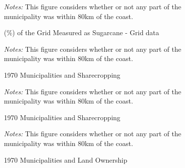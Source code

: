 \documentclass{article}
\begin{document}
\begin{figure}
  \caption{(\%) of the Grid Measured as Sugarcane - Grid data}
  \begin{center}
  \textit{Notes:} This figure considers whether or not any part of the municipality was within 80km of the coast.
  \end{center}
  \label{fig:sugarcane_grid}
\end{figure}

\clearpage

\begin{figure}
  \caption{1970 Municipalities and Sharecropping}
  \begin{center}
  \textit{Notes:} This figure considers whether or not any part of the municipality was within 80km of the coast.
  \end{center}
  \label{fig:sharecropping_1970}
\end{figure}

\begin{figure}[h!]
  \caption{1970 Municipalities and Sharecropping}
  \begin{center}
  \textit{Notes:} This figure considers whether or not any part of the municipality was within 80km of the coast.
  \end{center}
  \label{fig:sharecropping_1970}
\end{figure}

\begin{figure}
  \caption{1970 Municipalities and Land Ownership}
  \begin{center}
  \textit{Notes:} This figure considers whether or not any part of the municipality was within 80km of the coast.
  \end{center}
  \label{fig:land_ownership_1970}
\end{figure}
\end{document}
